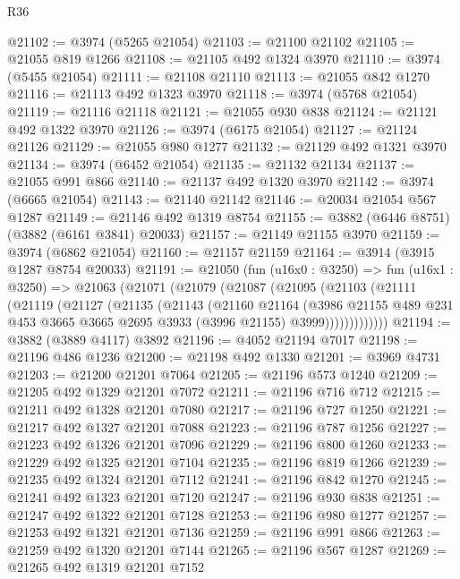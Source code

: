 \begin{lexlean}{R36}
\begin{coremodule}
@21102 := @3974 (@5265 @21054)
@21103 := @21100 @21102
@21105 := @21055 @819 @1266
@21108 := @21105 @492 @1324 @3970
@21110 := @3974 (@5455 @21054)
@21111 := @21108 @21110
@21113 := @21055 @842 @1270
@21116 := @21113 @492 @1323 @3970
@21118 := @3974 (@5768 @21054)
@21119 := @21116 @21118
@21121 := @21055 @930 @838
@21124 := @21121 @492 @1322 @3970
@21126 := @3974 (@6175 @21054)
@21127 := @21124 @21126
@21129 := @21055 @980 @1277
@21132 := @21129 @492 @1321 @3970
@21134 := @3974 (@6452 @21054)
@21135 := @21132 @21134
@21137 := @21055 @991 @866
@21140 := @21137 @492 @1320 @3970
@21142 := @3974 (@6665 @21054)
@21143 := @21140 @21142
@21146 := @20034 @21054 @567 @1287
@21149 := @21146 @492 @1319 @8754
@21155 := @3882 (@6446 @8751) (@3882 (@6161 @3841) @20033)
@21157 := @21149 @21155 @3970
@21159 := @3974 (@6862 @21054)
@21160 := @21157 @21159
@21164 := @3914 (@3915 @1287 @8754 @20033)
@21191 := @21050
    (fun (u16x0 : @3250) =>
    fun (u16x1 : @3250) =>
    @21063
      (@21071
        (@21079
          (@21087
            (@21095
              (@21103
                (@21111
                  (@21119
                    (@21127
                      (@21135
                        (@21143
                          (@21160
                            @21164
                            (@3986
                              @21155
                              @489
                              @231
                              @453
                              @3665
                              @3665
                              @2695
                              @3933
                              (@3996 @21155)
                              @3999)))))))))))))
@21194 := @3882 (@3889 @4117) @3892
@21196 := @4052 @21194 @7017
@21198 := @21196 @486 @1236
@21200 := @21198 @492 @1330
@21201 := @3969 @4731
@21203 := @21200 @21201 @7064
@21205 := @21196 @573 @1240
@21209 := @21205 @492 @1329 @21201 @7072
@21211 := @21196 @716 @712
@21215 := @21211 @492 @1328 @21201 @7080
@21217 := @21196 @727 @1250
@21221 := @21217 @492 @1327 @21201 @7088
@21223 := @21196 @787 @1256
@21227 := @21223 @492 @1326 @21201 @7096
@21229 := @21196 @800 @1260
@21233 := @21229 @492 @1325 @21201 @7104
@21235 := @21196 @819 @1266
@21239 := @21235 @492 @1324 @21201 @7112
@21241 := @21196 @842 @1270
@21245 := @21241 @492 @1323 @21201 @7120
@21247 := @21196 @930 @838
@21251 := @21247 @492 @1322 @21201 @7128
@21253 := @21196 @980 @1277
@21257 := @21253 @492 @1321 @21201 @7136
@21259 := @21196 @991 @866
@21263 := @21259 @492 @1320 @21201 @7144
@21265 := @21196 @567 @1287
@21269 := @21265 @492 @1319 @21201 @7152

\end{coremodule}
\end{lexlean}
